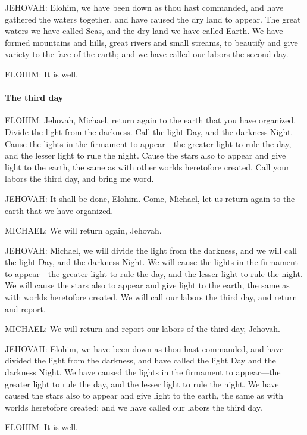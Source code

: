 				JEHOVAH: Elohim, we have been down as thou hast commanded, and have gathered the waters together, and have caused the dry land to appear. The great waters we have called Seas, and the dry land we have called Earth. We have formed mountains and hills, great rivers and small streams, to beautify and give variety to the face of the earth; and we have called our labors the second day.

				ELOHIM: It is well.
				
			\paragraph{The third day}
				\label{TEMPLE-ENDOWMENT-ENDOW-PRE-1990-DAY3}
			
				ELOHIM: Jehovah, Michael, return again to the earth that you have organized. Divide the light from the darkness. Call the light Day, and the darkness Night. Cause the lights in the firmament to appear---the greater light to rule the day, and the lesser light to rule the night. Cause the stars also to appear and give light to the earth, the same as with other worlds heretofore created. Call your labors the third day, and bring me word.

				JEHOVAH: It shall be done, Elohim. Come, Michael, let us return again to the earth that we have organized.

				MICHAEL: We will return again, Jehovah.

				JEHOVAH: Michael, we will divide the light from the darkness, and we will call the light Day, and the darkness Night. We will cause the lights in the firmament to appear---the greater light to rule the day, and the lesser light to rule the night. We will cause the stars also to appear and give light to the earth, the same as with worlds heretofore created. We will call our labors the third day, and return and report.

				MICHAEL: We will return and report our labors of the third day, Jehovah.

				JEHOVAH: Elohim, we have been down as thou hast commanded, and have divided the light from the darkness, and have called the light Day and the darkness Night. We have caused the lights in the firmament to appear---the greater light to rule the day, and the lesser light to rule the night. We have caused the stars also to appear and give light to the earth, the same as with worlds heretofore created; and we have called our labors the third day.

				ELOHIM: It is well.
				
